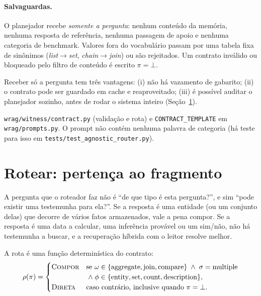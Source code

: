 \documentclass[11pt]{article}
\newcommand{\Compose}{\textsc{Compor}}
\newcommand{\Direct}{\textsc{Direta}}
\begin{document}
\paragraph{Salvaguardas.}
O planejador recebe \emph{somente a pergunta}: nenhum conteúdo da memória,
nenhuma resposta de referência, nenhuma passagem de apoio e nenhuma categoria
de benchmark. Valores fora do vocabulário passam por uma tabela fixa de
sinônimos (\emph{list}$\to$\emph{set}, \emph{chain}$\to$\emph{join}) ou são
rejeitados. Um contrato inválido ou bloqueado pelo filtro de conteúdo é
escrito $\pi=\bot$.

\begin{empalavras}
Receber só a pergunta tem três vantagens: (i) não há vazamento de gabarito;
(ii) o contrato pode ser guardado em cache e reaproveitado; (iii) é possível
auditar o planejador sozinho, antes de rodar o sistema inteiro
(Seção~\ref{sec:rota}).
\end{empalavras}

\begin{nocodigo}
\texttt{wrag/witness/contract.py} (validação e rota) e
\texttt{CONTRACT\_TEMPLATE} em \texttt{wrag/prompts.py}. O prompt não contém
nenhuma palavra de categoria (há teste para isso em
\texttt{tests/test\_agnostic\_router.py}).
\end{nocodigo}

\section{Rotear: pertença ao fragmento}\label{sec:rota}

\begin{intuicao}
A pergunta que o roteador faz não é ``de que tipo é esta pergunta?'', e sim
``pode existir uma testemunha para ela?''. Se a resposta é uma entidade (ou
um conjunto delas) que decorre de vários fatos armazenados, vale a pena
compor. Se a resposta é uma data a calcular, uma inferência provável ou um
sim/não, não há testemunha a buscar, e a recuperação híbrida com o leitor
resolve melhor.
\end{intuicao}

A rota é uma função determinística do contrato:
\begin{equation}
  \rho(\pi)=
  \begin{cases}
    \Compose & \text{se } \omega\in\{\text{aggregate},\text{join},\text{compare}\}
      \;\wedge\; \sigma=\text{multiple}\\
      & \;\wedge\; \phi\in\{\text{entity},\text{set},\text{count},\text{description}\},\\
    \Direct & \text{caso contrário, inclusive quando } \pi=\bot.
  \end{cases}
  \label{eq:rota}
\end{equation}
\end{document}
